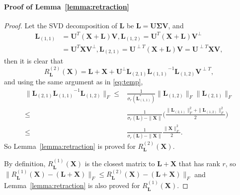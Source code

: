 \documentclass[12pt]{article}
\newcommand{\bX}{\boldsymbol{X}}
\newcommand{\bL}{\boldsymbol{L}}
\newcommand{\bSigma}{\boldsymbol\Sigma}
\newcommand{\bU}{\boldsymbol{U}}
\newcommand{\bV}{\boldsymbol{V}}
\def\bSigma{\boldsymbol\Sigma}
\def\bU{\boldsymbol{U}}
\theoremstyle{plain}
\theoremstyle{definition}
\theoremstyle{plain}
\theoremstyle{plain}
\theoremstyle{remark}
\begin{document}
\paragraph*{Proof of Lemma~\ref{lemma:retraction}}
\begin{proof}
Let the SVD decomposition of $\bL$ be $\bL=\bU\bSigma\bV$,  and
\begin{align*}
\bL_{(1,1)} & =\bU^{T}(\bX+\bL)\bV,\bL_{(1,2)}=\bU^{T}(\bX+\bL)\bV^{\perp}\\
 & =\bU^{T}\bX\bV^{\perp},\bL_{(2,1)}=\bU^{\perp T}(\bX+\bL)\bV=\bU^{\perp T}\bX\bV,
\end{align*}
then it is clear that
\[
R^{(2)}_{\bL}(\bX)=\bL+\bX+\bU^{\perp}\bL_{(2,1)}{\bL_{(1,1)}}^{-1}\bL_{(1,2)}\bV^{\perp T},
\]
and using the same argument as in \eqref{eq:temp}, 
\begin{align*}
\|\bL_{(2,1)}{\bL_{(1,1)}}^{-1}\bL_{(1,2)}\|_{F}\leq & \frac{1}{\sigma_{r}(\bL_{(1,1)}^{*})}\|\bL_{(1,2)}\|_{F}\|\bL_{(2,1)}\|_{F}\\
\leq & \frac{1}{\sigma_{r}(\bL)-\|\bX\|}\Big(\frac{\|\bL_{(2,1)}\|_{F}^{2}+\|\bL_{(1,2)}\|_{F}^{2}}{2}\Big)\\
\leq & \frac{1}{\sigma_{r}(\bL)-\|\bX\|}\frac{\|\bX\|_{F}^{2}}{2}.
\end{align*}
So Lemma~\ref{lemma:retraction} is proved for $R^{(2)}_{\bL}(\bX)$.


By definition, $R^{(1)}_{\bL}(\bX)$ is the closest matrix to $\bL+\bX$ that has rank $r$, so $\|R^{(1)}_{\bL}(\bX)-(\bL+\bX)\|_F\leq R^{(2)}_{\bL}(\bX)-(\bL+\bX)\|_F$ and Lemma~\ref{lemma:retraction} is also proved for $R^{(1)}_{\bL}(\bX)$.
\end{proof}
\end{document}
